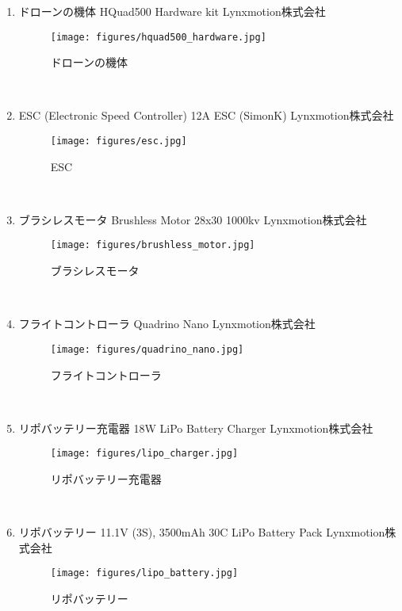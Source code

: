 \begin{enumerate}
\renewcommand{\labelenumi}{(\arabic{enumi})}
\item
  ドローンの機体 HQuad500 Hardware kit Lynxmotion株式会社
  \cite{hquad500_hardware:online}

  \begin{figure}[H]
  \centering
  \texttt{[image: figures/hquad500\_hardware.jpg]}
  \caption{ドローンの機体}
  \label{fig:hquad500}
  \end{figure}
  \\

\item
  ESC (Electronic Speed Controller) 12A ESC (SimonK) Lynxmotion株式会社
  \cite{esc:online}
  \begin{figure}[H]
  \centering
  \texttt{[image: figures/esc.jpg]}
  \caption{ESC}
  \label{fig:esc}
  \end{figure}
  \\

\item
  ブラシレスモータ Brushless Motor 28x30 1000kv Lynxmotion株式会社
  \cite{motor:online}
  \begin{figure}[H]
  \centering
  \texttt{[image: figures/brushless\_motor.jpg]}
  \caption{ブラシレスモータ}
  \label{fig:motor}
  \end{figure}
  \\

\item
  フライトコントローラ Quadrino Nano Lynxmotion株式会社
  \cite{quadrino_nano:online}
  \begin{figure}[H]
  \centering
  \texttt{[image: figures/quadrino\_nano.jpg]}
  \caption{フライトコントローラ}
  \label{fig:quadrino_nano}
  \end{figure}
  \\

\item
  リポバッテリー充電器 18W LiPo Battery Charger Lynxmotion株式会社
  \cite{lipo_charger:online}
  \begin{figure}[H]
  \centering
  \texttt{[image: figures/lipo\_charger.jpg]}
  \caption{リポバッテリー充電器}
  \label{fig:lipo_charger}
  \end{figure}
  \\

\item
  リポバッテリー 11.1V (3S), 3500mAh 30C LiPo Battery Pack Lynxmotion株式会社
  \cite{lipo_battery:online}
  \begin{figure}[H]
  \centering
  \texttt{[image: figures/lipo\_battery.jpg]}
  \caption{リポバッテリー}
  \label{fig:lipo_battery}
  \end{figure}
  \\


\end{enumerate}
